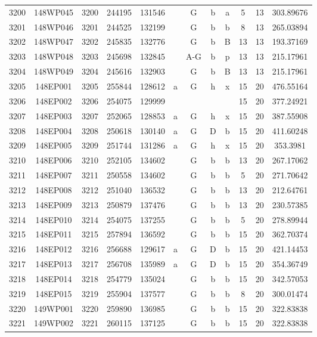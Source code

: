 \begin{tabular}{|*{12}{c|}}
3200 & 148WP045 & 3200 & 244195 & 131546 &  & G & b & a & 5 & 13 & 303.89676 \\ 
3201 & 148WP046 & 3201 & 244525 & 132199 &  & G & b & b & 8 & 13 & 265.03894 \\ 
3202 & 148WP047 & 3202 & 245835 & 132776 &  & G & b & B & 13 & 13 & 193.37169 \\ 
3203 & 148WP048 & 3203 & 245698 & 132845 &  & A-G & b & p & 13 & 13 & 215.17961 \\ 
3204 & 148WP049 & 3204 & 245616 & 132903 &  & G & b & B & 13 & 13 & 215.17961 \\ 
3205 & 148EP001 & 3205 & 255844 & 128612 & a & G & h & x & 15 & 20 & 476.55164 \\ 
3206 & 148EP002 & 3206 & 254075 & 129999 &  &  &  &  & 15 & 20 & 377.24921 \\ 
3207 & 148EP003 & 3207 & 252065 & 128853 & a & G & h & x & 15 & 20 & 387.55908 \\ 
3208 & 148EP004 & 3208 & 250618 & 130140 & a & G & D & b & 15 & 20 & 411.60248 \\ 
3209 & 148EP005 & 3209 & 251744 & 131286 & a & G & h & x & 15 & 20 & 353.3981 \\ 
3210 & 148EP006 & 3210 & 252105 & 134602 &  & G & b & b & 13 & 20 & 267.17062 \\ 
3211 & 148EP007 & 3211 & 250558 & 134602 &  & G & b & b & 5 & 20 & 271.70642 \\ 
3212 & 148EP008 & 3212 & 251040 & 136532 &  & G & b & b & 13 & 20 & 212.64761 \\ 
3213 & 148EP009 & 3213 & 250879 & 137476 &  & G & b & b & 13 & 20 & 230.57385 \\ 
3214 & 148EP010 & 3214 & 254075 & 137255 &  & G & b & b & 5 & 20 & 278.89944 \\ 
3215 & 148EP011 & 3215 & 257894 & 136592 &  & G & b & b & 15 & 20 & 362.70374 \\ 
3216 & 148EP012 & 3216 & 256688 & 129617 & a & G & D & b & 15 & 20 & 421.14453 \\ 
3217 & 148EP013 & 3217 & 256708 & 135989 & a & G & D & b & 15 & 20 & 354.36749 \\ 
3218 & 148EP014 & 3218 & 254779 & 135024 &  & G & b & b & 15 & 20 & 342.57053 \\ 
3219 & 148EP015 & 3219 & 255904 & 137577 &  & G & b & b & 8 & 20 & 300.01474 \\ 
3220 & 149WP001 & 3220 & 259890 & 136985 &  & G & b & b & 15 & 20 & 322.83838 \\ 
3221 & 149WP002 & 3221 & 260115 & 137125 &  & G & b & b & 15 & 20 & 322.83838 \\ 

\end{tabular}
